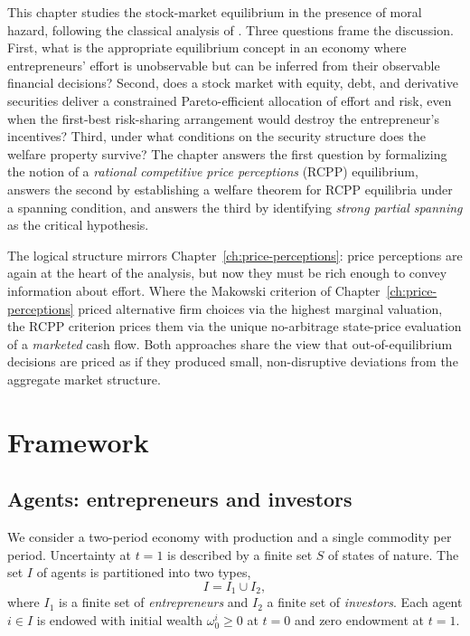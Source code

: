 \documentclass[11pt,a4paper,oneside]{book}
\def\geq{\geqslant}
\theoremstyle{plain}
\theoremstyle{definition}
\theoremstyle{remark}
\numberwithin{equation}{chapter}
\begin{document}
This chapter studies the stock-market equilibrium in the presence of moral hazard, following the classical analysis of \citet{MagillQuinzii2002}.
Three questions frame the discussion.
First, what is the appropriate equilibrium concept in an economy where entrepreneurs' effort is unobservable but can be inferred from their observable financial decisions?
Second, does a stock market with equity, debt, and derivative securities deliver a constrained Pareto-efficient allocation of effort and risk, even when the first-best risk-sharing arrangement would destroy the entrepreneur's incentives?
Third, under what conditions on the security structure does the welfare property survive?
The chapter answers the first question by formalizing the notion of a \emph{rational competitive price perceptions} (RCPP) equilibrium, answers the second by establishing a welfare theorem for RCPP equilibria under a spanning condition, and answers the third by identifying \emph{strong partial spanning} as the critical hypothesis.

The logical structure mirrors Chapter~\ref{ch:price-perceptions}: price perceptions are again at the heart of the analysis, but now they must be rich enough to convey information about effort.
Where the Makowski criterion of Chapter~\ref{ch:price-perceptions} priced alternative firm choices via the highest marginal valuation, the RCPP criterion prices them via the unique no-arbitrage state-price evaluation of a \emph{marketed} cash flow.
Both approaches share the view that out-of-equilibrium decisions are priced as if they produced small, non-disruptive deviations from the aggregate market structure.

\section{Framework}
\label{sec:MH-framework}

\subsection{Agents: entrepreneurs and investors}

We consider a two-period economy with production and a single commodity per period.
Uncertainty at $t=1$ is described by a finite set $S$ of states of nature.
The set $I$ of agents is partitioned into two types,
\begin{equation*}
  I = I_1 \cup I_2,
\end{equation*}
where $I_1$ is a finite set of \emph{entrepreneurs} and $I_2$ a finite set of \emph{investors}.
Each agent $i \in I$ is endowed with initial wealth $\omega^i_0 \geq 0$ at $t=0$ and zero endowment at $t=1$.
\end{document}
